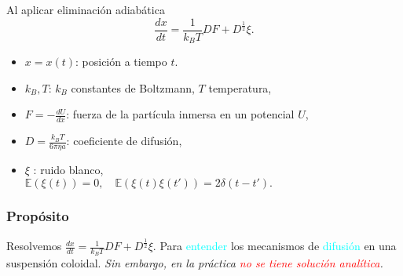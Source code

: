 \begin{bibunit}[apalike] 
 \begin{frame}[label=frm:6]{}
   \begin{alertblock}{Al aplicar eliminación
	adiabática \cite{gardiner1985handbook}}
      \begin{equation*}
          \frac{dx}{dt}=\frac{1}{k_BT} D F+D^{\frac{1}{2}}\xi.
        \end{equation*}
    \end{alertblock}
  \begin{itemize}
      \item $x=x(t)$: posici\'on a tiempo $t$.
      \item $k_B,T$: $k_B$  constantes de  Boltzmann, $T$ temperatura,
      \item $F= -\frac{dU}{dx}$:  fuerza de la part\'icula inmersa en un potencial $U$,
      \item $D=\frac{k_BT}{6\pi\eta a}$: coeficiente de difusi\'on,
      \item $\xi$ : ruido blanco,\\
        $
         	\mathbb{E}(\xi(t)) =0, \quad
        	 \mathbb{E}(\xi(t)\xi(t'))=2\delta(t-t').
        $
   \end{itemize}
\end{frame}
\end{bibunit}
\begin{bibunit}[apalike]
\begin{frame}\frametitle{Prop\'osito}
    \begin{block}
	{Resolvemos \quad $\frac{dx}{dt}=\frac{1}{k_BT} D F+D^{\frac{1}{2}}\xi.$}
	Para \textcolor{cyan}{entender} los mecanismos de \textcolor{cyan}{difusión}
	en una suspensión coloidal.
	\emph{Sin embargo, en la práctica \textcolor{red}{no se tiene solución analítica}.}
    \end{block}
\end{frame}
\end{bibunit}
